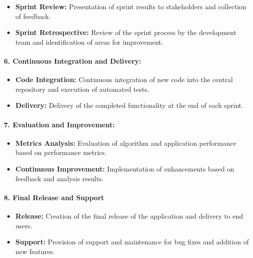 \documentclass[unnumsec,webpdf,contemporary,large]{oup-authoring-template}%
\theoremstyle{thmstyleone}%
\theoremstyle{thmstyletwo}%
\theoremstyle{thmstylethree}%
\begin{document}
\begin{itemize}
    \item \textbf{Sprint Review:} Presentation of sprint results to stakeholders and collection of feedback.
    \vspace{0.1cm}
    \item \textbf{Sprint Retrospective:} Review of the sprint process by the development team and identification of areas for improvement.
\end{itemize}
\vspace{0.1cm}

\paragraph{6. Continuous Integration and Delivery:}
\vspace{0.2cm}

\begin{itemize}
    \item \textbf{Code Integration:} Continuous integration of new code into the central repository and execution of automated tests.
    \item \textbf{Delivery:} Delivery of the completed functionality at the end of each sprint.
\end{itemize}
\vspace{0.1cm}

\paragraph{7. Evaluation and Improvement:}
\vspace{0.2cm}

\begin{itemize}
    \item \textbf{Metrics Analysis:} Evaluation of algorithm and application performance based on performance metrics.
    \item \textbf{Continuous Improvement:} Implementation of enhancements based on feedback and analysis results.
\end{itemize}
\vspace{0.1cm}

\paragraph{8. Final Release and Support}
\vspace{0.2cm}

\begin{itemize}
    \item \textbf{Release:} Creation of the final release of the application and delivery to end users.
    \item \textbf{Support:} Provision of support and maintenance for bug fixes and addition of new features.
\end{itemize}
\vspace{0.1cm}
\end{document}

